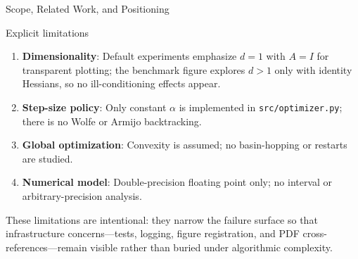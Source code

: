 \documentclass[
  ignorenonframetext,
]{beamer}
\providecommand{\tightlist}{%
  \setlength{\itemsep}{0pt}\setlength{\parskip}{0pt}}
\begin{document}
\begin{frame}[fragile]{Scope, Related Work, and Positioning}
\begin{block}{Explicit limitations}
\protect{}\label{explicit-limitations}
\begin{enumerate}
\tightlist
\item
  \textbf{Dimensionality}: Default experiments emphasize \(d = 1\) with
  \(A = I\) for transparent plotting; the benchmark figure explores
  \(d > 1\) only with identity Hessians, so no ill-conditioning effects
  appear.
\item
  \textbf{Step-size policy}: Only constant \(\alpha\) is implemented in
  \texttt{src/optimizer.py}; there is no Wolfe or Armijo backtracking.
\item
  \textbf{Global optimization}: Convexity is assumed; no basin-hopping
  or restarts are studied.
\item
  \textbf{Numerical model}: Double-precision floating point only; no
  interval or arbitrary-precision analysis.
\end{enumerate}

These limitations are intentional: they narrow the failure surface so
that infrastructure concerns---tests, logging, figure registration, and
PDF cross-references---remain visible rather than buried under
algorithmic complexity.
\end{block}
\end{frame}
\end{document}
